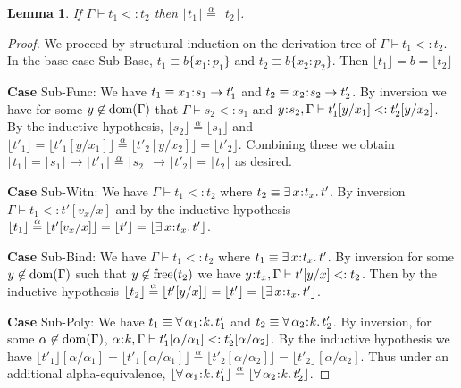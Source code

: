\documentclass[11pt]{article}
\newtheorem{lemma}[theorem]{Lemma}
\newcommand{\al}{\alpha}
\newcommand{\bind}{\hspace{0.05em}{:}\hspace{0.05em}} %
\newcommand{\col}{\mathbin{:}}       %
\newcommand{\existype}[3]{\exists\, #1\bind #2.\, #3}
\newcommand{\polytype}[3]{\forall\, #1\bind #2.\, #3}
\newcommand{\functype}[3]{#1\bind #2 \rightarrow #3}
\newcommand{\dom}[1]{{\rm dom}(#1)}
\begin{document}
\begin{lemma}\label{sub-erase} If $\Gamma \vdash t_1 <: t_2$ then $\lfloor t_1 \rfloor \overset{\al}{=} \lfloor t_2 \rfloor$. 
\end{lemma}
\begin{proof}
We proceed by structural induction on the derivation tree of $\Gamma \vdash t_1 <: t_2$. In the base case {\sc Sub-Base}, $t_1 \equiv b\{x_1\col p_1\}$ and $t_2 \equiv b\{x_2\col p_2\}$. Then $\lfloor t_1 \rfloor = b = \lfloor t_2 \rfloor$

{\bf Case} {\sc Sub-Func}: We have $t_1 \equiv \functype{x_1}{s_1}{t'_1}$ and $t_2 \equiv \functype{x_2}{s_2}{t'_2}$. By inversion we have for some $y\not\in\dom{\Gamma}$ that $\Gamma \vdash s_2 <: s_1$ and $y\bind s_2,\Gamma \vdash t'_1[y/x_1] <: t'_2[y/x_2]$. By the inductive hypothesis, $\lfloor s_2 \rfloor \overset{\al}{=} \lfloor s_1 \rfloor$ and $\lfloor t'_1 \rfloor = \lfloor t'_1[y/x_1] \rfloor \overset{\al}{=} \lfloor t'_2[y/x_2] \rfloor = \lfloor t'_2 \rfloor.$ Combining these we obtain 
$\lfloor t_1 \rfloor = \lfloor s_1 \rfloor \rightarrow \lfloor t'_1 \rfloor \overset{\al}{=} \lfloor s_2 \rfloor \rightarrow \lfloor t'_2 \rfloor = \lfloor t_2 \rfloor$ as desired.

{\bf Case} {\sc Sub-Witn}: We have $\Gamma \vdash t_1 <: t_2$ where $t_2 \equiv \existype{x}{t_x}{t'}$. By inversion $\Gamma \vdash t_1 <: t'[v_x/x]$ and by the inductive hypothesis $\lfloor t_1 \rfloor \overset{\al}{=} \lfloor t'[v_x/x] \rfloor = \lfloor t' \rfloor = \lfloor \existype{x}{t_x}{t'} \rfloor$.

{\bf Case} {\sc Sub-Bind}: We have $\Gamma \vdash t_1 <: t_2$ where $t_1 \equiv \existype{x}{t_x}{t'}$. By inversion for some $y \not\in\dom{\Gamma}$ such that $y \not\in{\rm free}(t_2)$ we have 
$y\bind t_x,\Gamma \vdash t'[y/x] <: t_2$. Then by the inductive hypothesis  $\lfloor t_2 \rfloor \overset{\al}{=} \lfloor t'[y/x] \rfloor = \lfloor t' \rfloor = \lfloor \existype{x}{t_x}{t'} \rfloor$.

{\bf Case} {\sc Sub-Poly}: We have $t_1 \equiv \polytype{\al_1}{k}{t'_1}$ and $t_2 \equiv \polytype{\al_2}{k}{t'_2}$. By inversion, for some $\al\not\in\dom{\Gamma}$, $\al\bind k,\Gamma \vdash t'_1[\al/\al_1] <: t'_2[\al/\al_2]$. By the inductive hypothesis we have
$\lfloor t'_1 \rfloor [\al/\al_1] = \lfloor t'_1[\al/\al_1] \rfloor
\overset{\al}{=} \lfloor t'_2[\al/\al_2] \rfloor = \lfloor t'_2 \rfloor [\al/\al_2].$ Thus under an additional alpha-equivalence, $\lfloor \polytype{\al_1}{k}{t'_1} \rfloor \overset{\al}{=} \lfloor \polytype{\al_2}{k}{t'_2} \rfloor$.
\end{proof}
\end{document}
